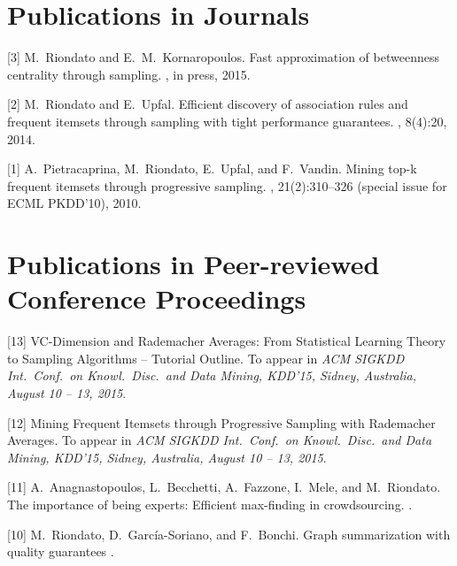 \documentclass[margin,line]{resume}
\begin{document}
\section{\sc Publications in Journals}

[3] M.~Riondato and E.~M.~Kornaropoulos.
\newblock Fast approximation of betweenness centrality through sampling.
, in press, 2015.

[2] M.~Riondato and E.~Upfal.
\newblock Efficient discovery of association rules and frequent itemsets through
sampling with tight performance guarantees.
, 8(4):20, 2014.

[1] A.~Pietracaprina, M.~Riondato, E.~Upfal, and F.~Vandin.
\newblock Mining top-k frequent itemsets through progressive sampling.
, 21(2):310--326 (special issue for
ECML PKDD'10), 2010.

\section{\sc Publications in Peer-reviewed Conference Proceedings}

[13] \newblock VC-Dimension and Rademacher Averages: From Statistical Learning
Theory to Sampling Algorithms -- Tutorial Outline.
\newblock To appear in {\em ACM SIGKDD Int.~Conf.~on Knowl.~Disc.~and
Data Mining, KDD'15, Sidney, Australia, August 10 -- 13, 2015}.

[12] \newblock Mining Frequent Itemsets through Progressive Sampling with
Rademacher Averages.
\newblock To appear in {\em ACM SIGKDD Int.~Conf.~on Knowl.~Disc.~and Data
Mining, KDD'15, Sidney, Australia, August 10 -- 13, 2015}.

[11] A.~Anagnastopoulos, L.~Becchetti, A.~Fazzone, I.~Mele, and M.~Riondato.
\newblock The importance of being experts: Efficient max-finding in
crowdsourcing.
.

[10] M.~Riondato, D.~Garc\'ia-Soriano, and F.~Bonchi.
\newblock Graph summarization with quality guarantees
.
\end{document}

